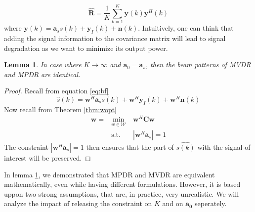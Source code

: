 \documentclass[12pt]{article}
\newtheorem{lemma}{Lemma}
\begin{document}
\begin{equation}\label{eq:mpdr_chat}
    \hat{\mathbf{R}} = \frac{1}{K}\sum_{k=1}^K \mathbf{y}(k)\mathbf{y}^H(k)
\end{equation}
where $\mathbf{y}(k) = \mathbf{a}_ss(k) + \mathbf{y}_I(k)+\mathbf{n}(k)$. Intuitively, one can think that adding the signal information to the covariance matrix will lead to signal degradation as we want to minimize its output power. 
\begin{lemma}\label{lem:mpdr}
    In case where $K\rightarrow\infty$ and $\mathbf{a}_0 = \mathbf{a}_s$, then the beam patterns of MVDR and MPDR are identical.
\end{lemma}
\begin{proof}
    Recall from equation \ref{eq:bf}
    \begin{equation*}
        \hat{s}(k)=\mathbf{w}^H\mathbf{a}_ss(k) + \mathbf{w}^H\mathbf{y}_I(k) + \mathbf{w}^H\mathbf{n}(k)
    \end{equation*}
    Now recall from Theorem \ref{thm:wopt} 
    $$\begin{aligned}
    \mathbf{w} =& \min_{w\in\mathcal{W}} &\mathbf{w}^H\mathbf{C}\mathbf{w}\\
    & \textrm{s.t.} \quad &|\mathbf{w}^H\mathbf{a}_s| = 1
\end{aligned}$$
    The constraint $|\mathbf{w}^H\mathbf{a}_s| = 1$ then ensures that the part of $\hat{s(k)}$ with the signal of interest will be preserved.
\end{proof}
In lemma \ref{lem:mpdr}, we demonstrated that MPDR and MVDR are equivalent mathematically, even while having different formulations. However, it is based uppon two strong assumptions, that are, in practice, very unrealistic. We will analyze the impact of releasing the constraint on $K$ and on $\mathbf{a_0}$ seperately.
\end{document}
